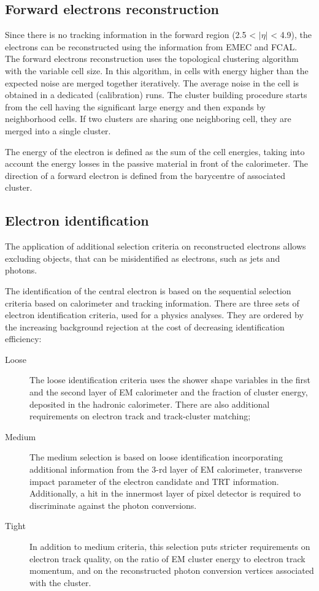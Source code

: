 \subsection{Forward electrons reconstruction}

Since there is no tracking information in the forward region (2.5 < $|\eta|$ < 4.9), the electrons can be reconstructed using the information from EMEC and FCAL. The forward electrons reconstruction uses the topological clustering algorithm\cite{Lampl:1099735} with the variable cell size. In this algorithm, in cells with energy higher than the expected noise are merged together iteratively. The average noise in the cell is obtained in a dedicated (calibration) runs. The cluster building procedure starts from the cell having the significant large energy and then expands by neighborhood cells. If two clusters are sharing one neighboring cell, they are merged into a single cluster. 

The energy of the electron is defined as the sum of the cell energies, taking into account the energy losses in the passive material in front of the calorimeter. The direction of a forward electron is defined from the barycentre of associated cluster.

\subsection{Electron identification}

The application of additional selection criteria on reconstructed electrons allows excluding objects, that can be misidentified as electrons, such as jets and photons. 

The identification of the central electron is based on the sequential selection criteria based on calorimeter and tracking information. There are three sets of electron identification criteria, used for a physics analyses\cite{1404.2240}. They are ordered by the increasing background rejection at the cost of decreasing identification efficiency:
\begin{description}
\item[Loose] The loose identification criteria  uses the shower shape variables in the first and the second layer of EM calorimeter and the fraction of cluster energy, deposited in the hadronic calorimeter. There are also additional requirements on electron track and track-cluster matching;
\item [Medium] The medium selection is based on loose identification incorporating additional information from the 3-rd layer of EM calorimeter, transverse impact parameter of the electron candidate and TRT information. Additionally, a hit in the innermost layer of pixel detector is required to discriminate against the photon conversions. 
\item [Tight] In addition to medium criteria, this selection puts stricter requirements on electron track quality, on the ratio of EM cluster energy to electron track momentum, and on the reconstructed photon conversion vertices associated with the cluster. 
\end{description}


